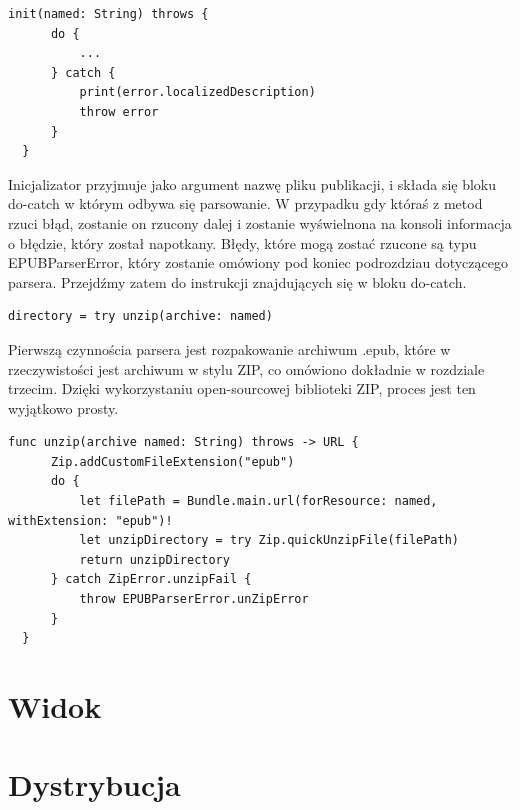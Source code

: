 \begin{lstlisting}[language=swift-reference]
  init(named: String) throws {
      do {
          ...
      } catch {
          print(error.localizedDescription)
          throw error
      }
  }
\end{lstlisting}

Inicjalizator przyjmuje jako argument nazwę pliku publikacji, i składa się bloku do-catch w którym odbywa się parsowanie. W przypadku gdy któraś z metod rzuci błąd, zostanie on rzucony dalej i zostanie wyświelnona na konsoli informacja o błędzie, który został napotkany. Błędy, które mogą zostać rzucone są typu EPUBParserError, który zostanie omówiony pod koniec podrozdziau dotyczącego parsera. Przejdźmy zatem do instrukcji znajdujących się w bloku do-catch.

\begin{lstlisting}[language=swift-reference]
    directory = try unzip(archive: named)
\end{lstlisting}

Pierwszą czynnościa parsera jest rozpakowanie archiwum .epub, które w rzeczywistości jest archiwum w stylu ZIP, co omówiono dokładnie w rozdziale trzecim. Dzięki wykorzystaniu open-sourcowej biblioteki ZIP, proces jest ten wyjątkowo prosty.

\begin{lstlisting}[language=swift-reference]
  func unzip(archive named: String) throws -> URL {
      Zip.addCustomFileExtension("epub")
      do {
          let filePath = Bundle.main.url(forResource: named, withExtension: "epub")!
          let unzipDirectory = try Zip.quickUnzipFile(filePath)
          return unzipDirectory
      } catch ZipError.unzipFail {
          throw EPUBParserError.unZipError
      }
  }
\end{lstlisting}



\section{Widok}
\section{Dystrybucja}
